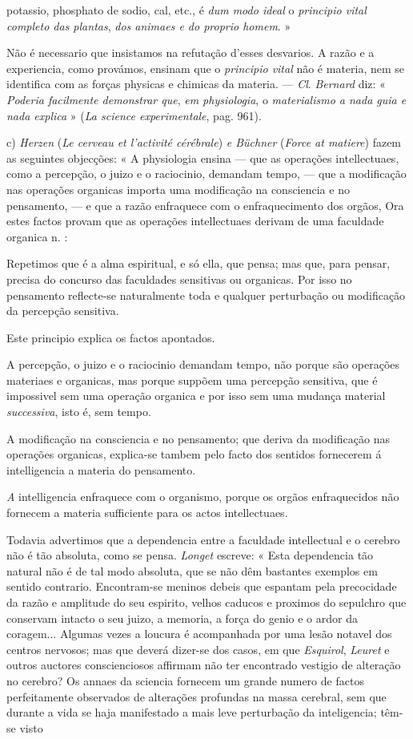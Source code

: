 potassio, phosphato de sodio, cal, etc., é \emph{dum modo ideal} o \emph{principio vital completo das plantas}, \emph{dos animaes e do proprio homem}. »\par Não é necessario que insistamos na refutação d'esses desvarios. A razão e a experiencia, como provámos, ensinam que o \emph{principio vital} não é materia, nem se identifica com as forças physicas e chimicas da materia. --- \emph{Cl}. \emph{Bernard} diz: « \emph{Poderia facilmente demonstrar que}, \emph{em physiologia}, o \emph{materialismo a nada guia e nada explica} » (\emph{La science experimentale}, pag. 961).\par c) \emph{Herzen} (\emph{Le cerveau et l'activité cérébrale}) \emph{e Büchner} (\emph{Force at matiere}) fazem as seguintes objecções: « A physiologia ensina --- que as operações intellectuaes, como a percepção, o juizo e o raciocinio, demandam tempo, --- que a modificação nas operações organicas importa uma modificação na consciencia e no pensamento, --- e que a razão enfraquece com o enfraquecimento dos orgãos, Ora estes factos provam que as operações intellectuaes derivam de uma faculdade organica n. :\par Repetimos que é a alma espiritual, e só ella, que pensa; mas que, para pensar, precisa do concurso das faculdades sensitivas ou organicas. Por isso no pensamento reflecte-se naturalmente toda e qualquer perturbação ou modificação da percepção sensitiva.\par Este principio explica os factos apontados.\par A percepção, o juizo e o raciocinio demandam tempo, não porque são operações materiaes e organicas, mas porque suppõem uma percepção sensitiva, que é impossivel sem uma operação organica e por isso sem uma mudança material \emph{successiva}, isto é, sem tempo.\par A modificação na consciencia e no pensamento; que deriva da modificação nas operações organicas, explica-se tambem pelo facto dos sentidos fornecerem á intelligencia a materia do pensamento.\par \emph{A} intelligencia enfraquece com o organismo, porque os orgãos enfraquecidos não fornecem a materia sufficiente para os actos intellectuaes.\par Todavia advertimos que a dependencia entre a faculdade intellectual e o cerebro não é tão absoluta, como se pensa. \emph{Longet} escreve: « Esta dependencia tão natural não é de tal modo absoluta, que se não dêm bastantes exemplos em sentido contrario. Encontram-se meninos debeis que espantam pela precocidade da razão e amplitude do seu espirito, velhos caducos e proximos do sepulchro que conservam intacto o seu juizo, a memoria, a força do genio e o ardor da coragem... Algumas vezes a loucura é acompanhada por uma lesão notavel dos centros nervosos; mas que deverá dizer-se dos casos, em que \emph{Esquirol}, \emph{Leuret} e outros auctores conscienciosos affirmam não ter encontrado vestigio de alteração no cerebro? Os annaes da sciencia fornecem um grande numero de factos perfeitamente observados de alterações profundas na massa cerebral, sem que durante a vida se haja manifestado a mais leve perturbação da inteligencia; têm-se visto 